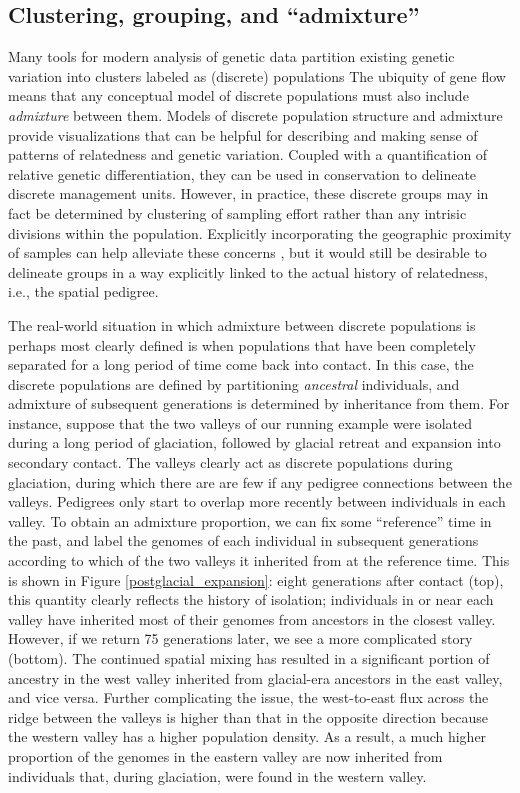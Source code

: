 \documentclass{ar-1col}
\renewcommand{\emph}[1]{{\textit{#1}}}
\begin{document}
{%
\subsection{Clustering, grouping, and ``admixture''}

Many tools for modern analysis of genetic data
partition existing genetic variation into clusters labeled as (discrete) populations
\citep[e.g.,][]{STRUCTURE, ADMIXTURE}
The ubiquity of gene flow means that
any conceptual model of discrete populations 
must also include \emph{admixture} between them.
Models of discrete population structure and admixture 
provide visualizations that can be helpful for
describing and making sense of patterns of relatedness and genetic variation.
Coupled with a quantification of relative genetic differentiation,
they can be used in conservation to delineate discrete management units.
However, in practice, these discrete groups may in fact be determined
by clustering of sampling effort rather than any intrisic divisions within the population.
Explicitly incorporating the geographic proximity of samples 
can help alleviate these concerns \citep{spacemix,conStruct},
but it would still be desirable to delineate groups in a way explicitly linked
to the actual history of relatedness, i.e., the spatial pedigree.

The real-world situation in which admixture between discrete populations 
is perhaps most clearly defined is when populations that have been completely separated
for a long period of time come back into contact.
In this case, the discrete populations are defined by partitioning \emph{ancestral} individuals,
and admixture of subsequent generations is determined by inheritance from them.
For instance, suppose that 
the two valleys of our running example
were isolated during a long period of glaciation,
followed by glacial retreat and expansion into secondary contact.
The valleys clearly act as discrete populations during glaciation, 
during which there are are few if any pedigree connections between the valleys.
Pedigrees only start to overlap more recently between individuals in each valley.
To obtain an admixture proportion,
we can fix some ``reference'' time in the past,
and label the genomes of each individual in subsequent generations 
according to which of the two valleys it inherited from at the reference time.
This is shown in Figure \ref{postglacial_expansion}:
eight generations after contact (top),
this quantity clearly reflects the history of isolation;  
individuals in or near each valley have inherited most of their genomes 
from ancestors in the closest valley.
However, if we return 75 generations later, 
we see a more complicated story (bottom).
The continued spatial mixing has resulted in a significant 
portion of ancestry in the west valley inherited from 
glacial-era ancestors in the east valley, 
and vice versa.
Further complicating the issue, 
the west-to-east flux across the ridge between the valleys 
is higher than that in the opposite direction 
because the western valley has a higher population density. 
As a result, a much higher proportion of the genomes
in the eastern valley are now inherited 
from individuals that, 
during glaciation, were found in the western valley.

}
\end{document}
